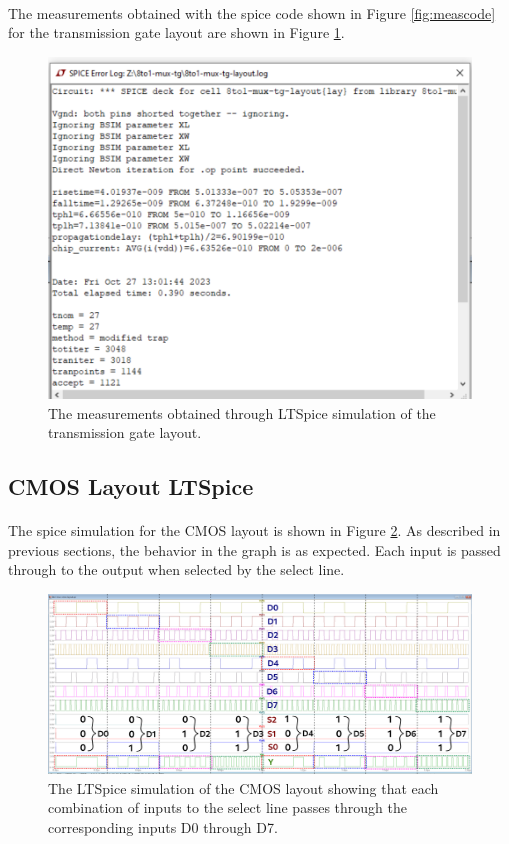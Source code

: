 \documentclass{article}
\begin{document}
    \paragraph{}
    The measurements obtained with the spice code shown in Figure \ref{fig:meascode} for the transmission gate layout are shown in Figure \ref{fig:tglaymeas}.

    \begin{figure}[H]
      \centering
      \includegraphics[width=0.5\linewidth, frame]{screenshots/tg/lay/meas.png}
      \caption{The measurements obtained through LTSpice simulation of the transmission gate layout.}
      \label{fig:tglaymeas}
    \end{figure}


  \subsection{CMOS Layout LTSpice}
    \paragraph{}
    The spice simulation for the CMOS layout is shown in Figure \ref{fig:cmoslayspice}. As described in previous sections, the behavior in the graph is as expected. Each input is passed through to the output when selected by the select line.

    \begin{figure}[H]
      \centering
      \includegraphics[width=\linewidth, frame]{screenshots/cmos/lay/spice.png}
      \caption{The LTSpice simulation of the CMOS layout showing that each combination of inputs to the select line passes through the corresponding inputs D0 through D7.}
      \label{fig:cmoslayspice}
    \end{figure}
\end{document}
